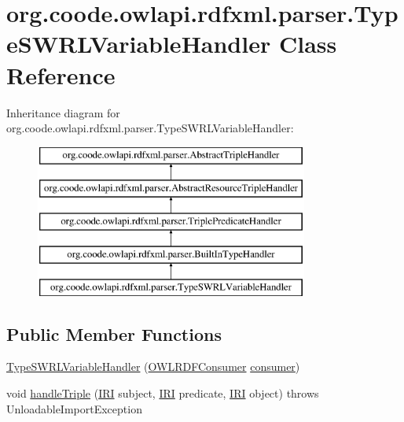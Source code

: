 \hypertarget{classorg_1_1coode_1_1owlapi_1_1rdfxml_1_1parser_1_1_type_s_w_r_l_variable_handler}{\section{org.\-coode.\-owlapi.\-rdfxml.\-parser.\-Type\-S\-W\-R\-L\-Variable\-Handler Class Reference}
\label{classorg_1_1coode_1_1owlapi_1_1rdfxml_1_1parser_1_1_type_s_w_r_l_variable_handler}
}
Inheritance diagram for org.\-coode.\-owlapi.\-rdfxml.\-parser.\-Type\-S\-W\-R\-L\-Variable\-Handler\-:\begin{figure}[H]
\begin{center}
\leavevmode
\includegraphics[height=5.000000cm]{classorg_1_1coode_1_1owlapi_1_1rdfxml_1_1parser_1_1_type_s_w_r_l_variable_handler}
\end{center}
\end{figure}
\subsection*{Public Member Functions}
\begin{DoxyCompactItemize}
\item 
\hyperlink{classorg_1_1coode_1_1owlapi_1_1rdfxml_1_1parser_1_1_type_s_w_r_l_variable_handler_a00b52a89a33ca0bc63af320069d3eb05}{Type\-S\-W\-R\-L\-Variable\-Handler} (\hyperlink{classorg_1_1coode_1_1owlapi_1_1rdfxml_1_1parser_1_1_o_w_l_r_d_f_consumer}{O\-W\-L\-R\-D\-F\-Consumer} \hyperlink{classorg_1_1coode_1_1owlapi_1_1rdfxml_1_1parser_1_1_abstract_triple_handler_a4ccf4d898ff01eb1cadfa04b23d54e9c}{consumer})
\item 
void \hyperlink{classorg_1_1coode_1_1owlapi_1_1rdfxml_1_1parser_1_1_type_s_w_r_l_variable_handler_aaa91aa2edc1532f292c82bc3e888ade2}{handle\-Triple} (\hyperlink{classorg_1_1semanticweb_1_1owlapi_1_1model_1_1_i_r_i}{I\-R\-I} subject, \hyperlink{classorg_1_1semanticweb_1_1owlapi_1_1model_1_1_i_r_i}{I\-R\-I} predicate, \hyperlink{classorg_1_1semanticweb_1_1owlapi_1_1model_1_1_i_r_i}{I\-R\-I} object)  throws Unloadable\-Import\-Exception 
\end{DoxyCompactItemize}
